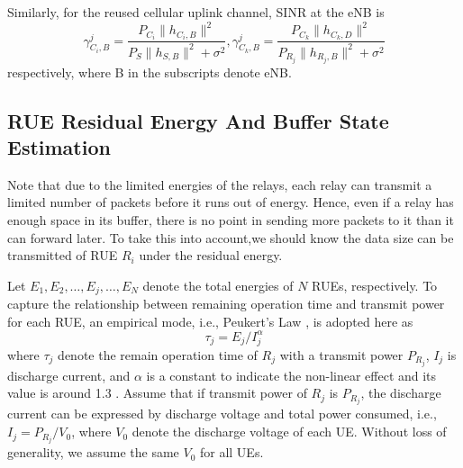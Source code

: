 \documentclass[conference]{IEEEtran}
\begin{document}
Similarly, for the reused cellular uplink channel, SINR at the eNB is
\begin{equation}
\gamma^{j}_{C_i,B} = \frac{P_{C_i}\|{h_{C_i,B}}\|^{2}}{P_S\|{h_{S,B}}\|^{2} + \sigma^2} ,\gamma^{j}_{C_k,B} = \frac{P_{C_k}\|{h_{C_k,D}}\|^{2}}{P_{R_j}\|{h_{R_j,B}}\|^{2} + \sigma^2}
\end{equation}
respectively, where B in the subscripts denote eNB.

\subsection{RUE Residual Energy And Buffer State Estimation}
Note that due to the limited energies of the relays, each relay can transmit a limited number of packets before it runs out of energy. Hence, even if a relay has enough space in its buffer, there is no point in sending more packets to it than it can forward later. To take this into account,we should know the data size can be transmitted of RUE $R_i$ under the residual energy.

Let $E_{1},E_{2},\ldots,E_{j},\ldots,E_{N}$ denote the total energies of $N$ RUEs, respectively. To capture the relationship between remaining operation time and transmit power for each RUE, an empirical mode, i.e., Peukert's Law \cite{6981957}, is adopted here as
\begin{equation}
\tau_j = E_j/I^{\alpha}_j
\end{equation}
where $\tau_j$ denote the remain operation time of $R_j$ with a transmit power $P_{R_j}$, $I_j$ is discharge current, and $\alpha$ is a constant to indicate the non-linear effect and its value is around 1.3 \cite{6981957}. Assume that if transmit power of $R_j$ is $P_{R_j}$, the discharge current can be expressed by discharge voltage and total power consumed, i.e., $I_j = P_{R_j} / V_0$, where $V_0$ denote the discharge voltage of each UE. Without loss of generality, we assume the same $V_0$ for all UEs.
\end{document}
